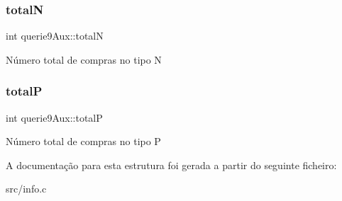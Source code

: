 \subsubsection{\texorpdfstring{totalN}{totalN}}
{\footnotesize\ttfamily int querie9\+Aux\+::totalN}

Número total de compras no tipo N \mbox{\label{structquerie9Aux_a0fa6c4da6f8be963d045f313e2d7d2ef}} 
\subsubsection{\texorpdfstring{totalP}{totalP}}
{\footnotesize\ttfamily int querie9\+Aux\+::totalP}

Número total de compras no tipo P 

A documentação para esta estrutura foi gerada a partir do seguinte ficheiro\+:\begin{DoxyCompactItemize}
\item 
src/info.\+c\end{DoxyCompactItemize}
